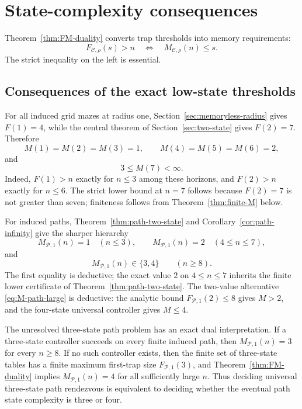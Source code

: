 \section{State-complexity consequences}\label{sec:state-complexity}

Theorem~\ref{thm:FM-duality} converts trap thresholds into memory requirements:
\[
 F_{\mathcal C,\rho}(s)>n
 \quad\Longleftrightarrow\quad
 M_{\mathcal C,\rho}(n)\le s.
\]
The strict inequality on the left is essential.

\subsection{Consequences of the exact low-state thresholds}

For all induced grid mazes at radius one, Section~\ref{sec:memoryless-radius} gives $F(1)=4$, while the central theorem of Section~\ref{sec:two-state} gives $F(2)=7$.  Therefore
\begin{equation}\label{eq:M-original-small}
 \boxed{M(1)=M(2)=M(3)=1},
 \qquad
 \boxed{M(4)=M(5)=M(6)=2},
\end{equation}
and
\begin{equation}\label{eq:M7-bound}
 \boxed{3\le M(7)<\infty}.
\end{equation}
Indeed, $F(1)>n$ exactly for $n\le3$ among these horizons, and $F(2)>n$ exactly for $n\le6$.  The strict lower bound at $n=7$ follows because $F(2)=7$ is not greater than seven; finiteness follows from Theorem~\ref{thm:finite-M} below.

For induced paths, Theorem~\ref{thm:path-two-state} and Corollary~\ref{cor:path-infinity} give the sharper hierarchy
\begin{equation}\label{eq:M-path-small}
 M_{\mathcal P,1}(n)=1\quad(n\le3),
 \qquad
 M_{\mathcal P,1}(n)=2\quad(4\le n\le7),
\end{equation}
and
\begin{equation}\label{eq:M-path-large}
 \boxed{M_{\mathcal P,1}(n)\in\{3,4\}\qquad(n\ge8).}
\end{equation}
The first equality is deductive; the exact value $2$ on $4\le n\le7$ inherits the finite lower certificate of Theorem~\ref{thm:path-two-state}. The two-value alternative \eqref{eq:M-path-large} is deductive: the analytic bound $F_{\mathcal P,1}(2)\le8$ gives $M>2$, and the four-state universal controller gives $M\le4$.



The unresolved three-state path problem has an exact dual interpretation.  If a three-state controller succeeds on every finite induced path, then $M_{\mathcal P,1}(n)=3$ for every $n\ge8$.  If no such controller exists, then the finite set of three-state tables has a finite maximum first-trap size $F_{\mathcal P,1}(3)$, and Theorem~\ref{thm:FM-duality} implies $M_{\mathcal P,1}(n)=4$ for all sufficiently large $n$.  Thus deciding universal three-state path rendezvous is equivalent to deciding whether the eventual path state complexity is three or four.

